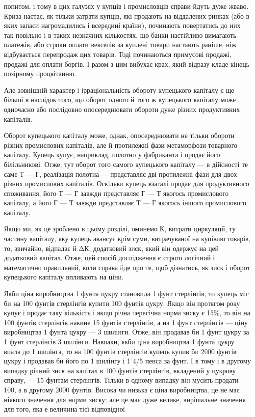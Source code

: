 \parcont{}  %
попитом, і тому в цих галузях у купців і промисловців справи
йдуть дуже жваво. Криза настає, як тільки затрати купців, які
продають на віддалених ринках (або в яких запаси нагромадились
і всередині країни), починають повертатись до них так
повільно і в таких незначних кількостях, що банки настійливо
вимагають платежів, або строки оплати векселів за куплені
товари настають раніше, ніж відбувається перепродаж цих
товарів. Тоді починаються примусові продажі, продажі для
оплати боргів. І разом з цим вибухає крах, який відразу кладе
кінець позірному процвітанню.

Але зовнішній характер і ірраціональність обороту купецького
капіталу є ще більші в наслідок того, що оборот одного й того ж
купецького капіталу може одночасно або послідовно опосереднювати
обороти дуже різних продуктивних капіталів.

Оборот купецького капіталу може, однак, опосереднювати
не тільки обороти різних промислових капіталів, але й протилежні
фази метаморфози товарного капіталу. Купець купує,
наприклад, полотно у фабриканта і продає його білільникові.
Отже, тут оборот того самого купецького капіталу — в дійсності
те саме Т — Г, реалізація полотна — представляє дві протилежні
фази для двох різних промислових капіталів. Оскільки
купець взагалі продає для продуктивного споживання, його
Т — Г завжди представляє Г — Т якогось промислового капіталу,
а його Г — Т завжди представляє Т — Г якогось іншого промислового
капіталу.

Якщо ми, як це зроблено в цьому розділі, оминемо К, витрати
циркуляції, ту частину капіталу, яку купець авансує крім
суми, витрачуваної на купівлю товарів, то, звичайно, відпадає
й ΔК, додатковий зиск, який він одержує на цей додатковий
капітал. Отже, цей спосіб дослідження є строго логічний і математично
правильний, коли справа йде про те, щоб дізнатись,
як зиск і оборот купецького капіталу впливають на ціни.

Якби ціна виробництва 1 фунта цукру становила 1 фунт
стерлінгів, то купець міг би на 100 фунтів стерлінгів купити
100 фунтів цукру. Якщо він протягом року купує і продає таку
кількість і якщо річна пересічна норма зиску є 15\%, то він
на 100 фунтів стерлінгів накине 15 фунтів стерлінгів, а на
1 фунт стерлінгів — ціну виробництва 1 фунта цукру — 3 шилінги.
Отже, він продавав би 1 фунт цукру за 1 фунт стерлінгів 3 шилінги.
Навпаки, якби ціна виробництва 1 фунта цукру впала до
1 шилінга, то на 100 фунтів стерлінгів купець купив би 2000 фунтів
цукру і продавав би його по 1 шилінгу і 1 4/5 пенса за фунт.
І в тому і в другому випадку річний зиск на капітал в 100 фунтів
стерлінгів, вкладений у цукрову справу, — 15 фунтам стерлінгів.
Тільки в одному випадку він мусить продати 100, а в другому
2000 фунтів. Висока чи низька є ціна виробництва, це не має
ніякого значення для норми зиску; але це має дуже велике,
вирішальне значення для того, яка е величина тієї відповідної
\parbreak{}  %
